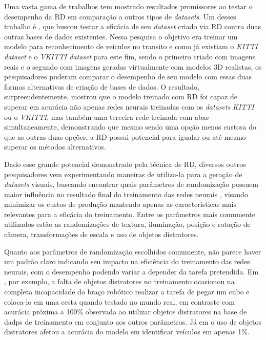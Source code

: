 \documentclass[a4paper,12pt]{article}
\begin{document}
{Uma vasta gama de trabalhos tem mostrado resultados promissores ao testar o desempenho da RD em comparação a outros tipos de \emph{datasets}. Um desses trabalho é \cite{tremblay2018training}, que buscou testar a eficácia de seu \emph{dataset} criado via RD contra duas outras bases de dados existentes. Nessa pesquisa o objetivo era treinar um modelo para reconhecimento de veículos no transito e como já existiam o \emph{KITTI dataset} \cite{doi:10.1177/0278364913491297} e o \emph{VKITTI dataset} \cite{gaidon2016virtual} para este fim, sendo o primeiro criado com imagens reais e o segundo com imagens geradas virtualmente com modelos 3D realistas, os pesquisadores puderam comparar o desempenho de seu modelo com essas duas formas alternativas de criação de bases de dados. O resultado, surpreendentemente, mostrou que o modelo treinado com RD foi capaz de superar em acurácia não apenas redes neurais treinadas com os \emph{datasets} \emph{KITTI}  ou o \emph{VKITTI}, mas também uma terceira rede treinada com abas simultaneamente, demonstrando que mesmo sendo uma opção menos custosa do que as outras duas opções, a RD possui potencial para igualar ou até mesmo superar os métodos alternativos. 

 Dado esse grande potencial demonstrado pela técnica de RD, diversos outros pesquisadores vem experimentando maneiras de utiliza-la para a geração de \emph{datasets} visuais, buscando encontrar quais parâmetros de randomização possuem maior influência no resultado final do treinamento das redes neurais \cite{valtchev2021domain, yue2019domain}, visando minimizar os custos de produção mantendo apenas as características mais relevantes para a eficácia do treinamento. Entre os parâmetros mais comumente utilizados estão as randomizações de textura, iluminação, posição e rotação de câmera, transformações de escala e uso de objetos distratores.

 Quanto aos parâmetros de randomização escolhidos comumente, não parece haver um padrão claro indicando seu impacto na eficiência do treinamento das redes neurais, com o desempenho podendo variar a depender da tarefa pretendida. Em \cite{james2017transferring}, por exemplo, a falta de objetos distratores no treinamento ocasionou na completa incapacidade do braço robótico realizar a tarefa de pegar um cubo e coloca-lo em uma cesta quando testado no mundo real, em contraste com acurácia próxima a 100\% observada ao utilizar objetos distratores na base de dadps de treinamento em conjunto aos outros parâmetros. Já em \cite{tremblay2018training} o uso de objetos distratores afetou a acurácia do modelo em identificar veículos em apenas 1\%.

}
\end{document}
